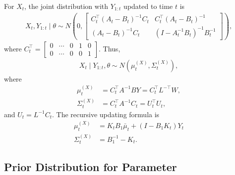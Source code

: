 For $X_{t}$, the joint distribution with $Y_{1:t}$ updated to time $t$ is 
\begin{align*}
X_{t}, Y_{1:t} \mid \theta \sim N\left( 0, \begin{bmatrix}
C_{t}^\top\left(A_{t}-B_{t}\right) ^{-1}C_{t} & C_{t}^\top \left(A_{t}-B_{t}\right)^{-1}\\
\left(A_{t}-B_{t}\right)^{-1}C_{t} & \left(I- A_{t}^{-1}B_{t}\right) ^{-1}B_{t}^{-1}
\end{bmatrix} \right),
\end{align*}
where $C_{t}^\top=\begin{bmatrix}
0 & \cdots & 0 & 1 & 0 \\ 0 & \cdots & 0 & 0 & 1 
\end{bmatrix}$. Thus,
\begin{align*}
X_{t}\mid Y_{1:t},\theta \sim N\left(\mu_{t}^{\left(X\right)},\Sigma_{t}^{\left(X\right)}\right),
\end{align*}
where
\begin{align*}
\mu_{t}^{\left(X\right)} & = C_{t}^\top A^{-1}BY =C_{t}^\top L^{-\top}W,\\
\Sigma_{t}^{\left(X\right)} & =C_{t}^\top A^{-1}C_{t} =U_{t}^\top U_{t},
\end{align*}
and $U_{t} = L^{-1} C_{t}$.
The recursive updating formula is  
\begin{align}
\mu_{t}^{\left(X\right)}  &=  K_{t}B_1\bar{\mu}_{t} + \left(I - B_1K_{t}\right)Y_{t}  \\
\Sigma_{t}^{\left(X\right)}  &=B_1^{-1}-K_{t}.
\end{align}





\subsection{Prior Distribution for Parameter}


